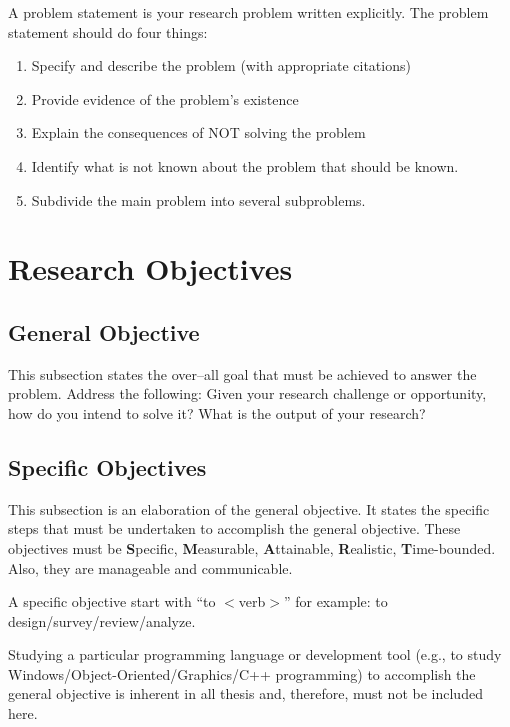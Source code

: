 A problem statement is your research problem written explicitly.  
The problem statement should do four things: 
\begin{enumerate}
	\item Specify and describe the problem (with appropriate citations) 
	\item  Provide evidence of the problem’s existence  
	\item Explain the consequences of NOT solving the problem  
	\item 	Identify what is not known about the problem that should be known.
	\item Subdivide the main problem into several subproblems.
\end{enumerate}


\section{Research Objectives}
\label{sec:researchobjectives}

\subsection{General Objective}
\label{sec:generalobjective}

This subsection states the over--all goal that must be achieved to answer the problem.
Address the following: Given your research challenge or opportunity, how do you intend  to solve it? What is the output of your research?


\subsection{Specific Objectives}
\label{sec:specificobjectives}

%
%

This subsection is an elaboration of the general objective.  
It states the specific steps that must be undertaken to accomplish the general objective.  
These objectives must be \textbf{S}pecific, \textbf{M}easurable, \textbf{A}ttainable, \textbf{R}ealistic, \textbf{T}ime-bounded. Also, they are manageable and communicable.  

A specific objective start with ``to $<$verb$>$'' for example: to design/survey/review/analyze.

Studying a particular programming language or development tool (e.g., to study Windows/Object-Oriented/Graphics/C++ programming) to  accomplish the general objective is inherent in all thesis and, therefore, must not be included here.


